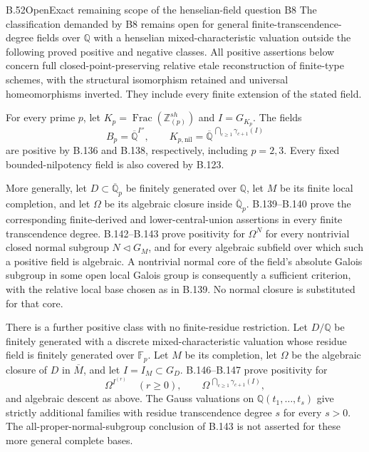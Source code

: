 \begin{claim}{B.52}{Open}{Exact remaining scope of the henselian-field question B8}
The classification demanded by B8 remains open for general
finite-transcendence-degree fields over $\mathbb Q$ with a
henselian mixed-characteristic valuation outside the following
proved positive and negative classes. All positive assertions
below concern full closed-point-preserving relative etale
reconstruction of finite-type schemes, with the structural
isomorphism retained and universal homeomorphisms inverted.
They include every finite extension of the stated field.

For every prime $p$, let
$K_p=\operatorname{Frac}(\mathbb Z_{(p)}^{sh})$ and $I=G_{K_p}$.
The fields
\[
 B_p=\overline{\mathbb Q}^{I''},\qquad
 K_{p,\mathrm{nil}}=
   \overline{\mathbb Q}^{\,\bigcap_{c\ge1}\gamma_{c+1}(I)}
\]
are positive by B.136 and B.138, respectively, including $p=2,3$.
Every fixed bounded-nilpotency field is also covered by B.123.

More generally, let $D\subset\overline{\mathbb Q}_p$ be
finitely generated over $\mathbb Q$, let $M$ be its finite
local completion, and let $\Omega$ be its algebraic closure
inside $\overline{\mathbb Q}_p$.
B.139--B.140 prove the corresponding finite-derived and
lower-central-union assertions in every finite transcendence
degree. B.142--B.143 prove positivity for
$\Omega^N$ for every nontrivial closed normal subgroup
$N\triangleleft G_M$, and for every algebraic subfield
over which such a positive field is algebraic.
A nontrivial normal core of the field's absolute Galois
subgroup in some open local Galois group is consequently
a sufficient criterion, with the relative local base
chosen as in B.139. No normal closure is substituted
for that core.

There is a further positive class with no finite-residue
restriction. Let $D/\mathbb Q$ be finitely generated with
a discrete mixed-characteristic valuation whose residue
field is finitely generated over $\mathbb F_p$.
Let $M$ be its completion, let $\Omega$ be the algebraic
closure of $D$ in $\overline M$, and let $I=I_M\subset G_D$.
B.146--B.147 prove positivity for
\[
 \Omega^{I^{(r)}}\quad(r\ge0),\qquad
 \Omega^{\,\bigcap_{c\ge1}\gamma_{c+1}(I)},
\]
and algebraic descent as above.
The Gauss valuations on $\mathbb Q(t_1,\ldots,t_s)$
give strictly additional families with residue
transcendence degree $s$ for every $s>0$.
The all-proper-normal-subgroup conclusion of B.143
is not asserted for these more general complete bases.


\end{claim}
